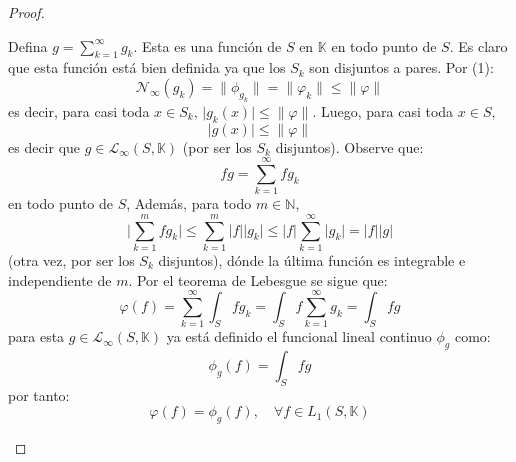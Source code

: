 \documentclass[12pt]{report}
\theoremstyle{largebreak}
\newcommand\abs[1]{\ensuremath{\big|#1\big|}}
\newcommand\norm[1]{\ensuremath{\|#1\|}}
\newcommand{\N}[2]{\ensuremath{\mathcal{N}_{#1}\left(#2\right)}}
\begin{document}
\begin{proof}
\begin{enumerate}
\begin{equation*}
            \end{equation*}
            Defina $g=\sum_{ k=1}^{\infty}g_k$. Esta es una función de $S$ en $\mathbb{K}$ en todo punto de $S$. Es claro que esta función está bien definida ya que los $S_k$ son disjuntos a pares. Por (1):
            \begin{equation*}
                \N{\infty}{g_k}=\norm{\phi_{g_k}}=\norm{\varphi_k}\leq\norm{\varphi}
            \end{equation*}
            es decir, para casi toda $x\in S_k$, $\abs{g_k(x)}\leq\norm{\varphi}$. Luego, para casi toda $x\in S$,
            \begin{equation*}
                \abs{g(x)}\leq \norm{\varphi}
            \end{equation*}
            es decir que $g\in\mathcal{L}_\infty(S,\mathbb{K})$ (por ser los $S_k$ disjuntos). Observe que:
            \begin{equation*}
                fg=\sum_{ k=1}^{\infty}fg_k
            \end{equation*}
            en todo punto de $S$, Además, para todo $m\in\mathbb{N}$,
            \begin{equation*}
                \abs{\sum_{ k=1}^{m}fg_k}\leq\sum_{ k=1}^{m}\abs{f}\abs{g_k}\leq \abs{f}\sum_{ k=1}^{\infty}\abs{g_k}=\abs{f}\abs{g}
            \end{equation*}
            (otra vez, por ser los $S_k$ disjuntos), dónde la última función es integrable e independiente de $m$. Por el teorema de Lebesgue se sigue que:
            \begin{equation*}
                \varphi(f)=\sum_{ k=1}^{\infty}\int_Sfg_k=\int_Sf\sum_{ k=1}^{\infty}g_k=\int_Sfg
            \end{equation*}
            para esta $g\in\mathcal{L}_\infty(S,\mathbb{K})$ ya está definido el funcional lineal continuo $\phi_g$ como:
            \begin{equation*}
                \phi_g(f)=\int_Sfg
            \end{equation*}
            por tanto:
            \begin{equation*}
                \varphi(f)=\phi_g(f),\quad\forall f\in L_1(S,\mathbb{K})
            \end{equation*}
        \end{enumerate}
    \end{proof}
\end{document}
